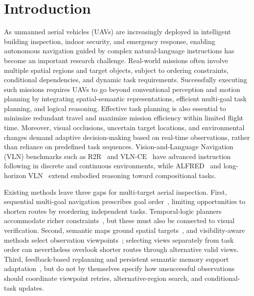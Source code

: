 \documentclass[letterpaper,10pt,journal]{IEEEtran}
\begin{document}
\section{Introduction}
As unmanned aerial vehicles (UAVs) are increasingly deployed in intelligent building inspection, indoor security, and emergency response, enabling autonomous navigation guided by complex natural-language instructions has become an important research challenge. Real-world missions often involve multiple spatial regions and target objects, subject to ordering constraints, conditional dependencies, and dynamic task requirements. Successfully executing such missions requires UAVs to go beyond conventional perception and motion planning by integrating spatial-semantic representations, efficient multi-goal task planning, and logical reasoning. Effective task planning is also essential to minimize redundant travel and maximize mission efficiency within limited flight time. Moreover, visual occlusions, uncertain target locations, and environmental changes demand adaptive decision-making based on real-time observations, rather than reliance on predefined task sequences. Vision-and-Language Navigation (VLN) benchmarks such as R2R~\cite{anderson2018r2r} and VLN-CE~\cite{krantz2020vlnce} have advanced instruction following in discrete and continuous environments, while ALFRED~\cite{shridhar2020alfred} and long-horizon VLN~\cite{song2024lhvln} extend embodied reasoning toward compositional tasks.

Existing methods leave three gaps for multi-target aerial inspection. First, sequential multi-goal navigation prescribes goal order~\cite{wani2020multion,khanna2024goat}, limiting opportunities to shorten routes by reordering independent tasks. Temporal-logic planners accommodate richer constraints~\cite{dai2024osgp}, but these must also be connected to visual verification. Second, semantic maps ground spatial targets~\cite{huang2023vlmaps,werby2024hovsg}, and visibility-aware methods select observation viewpoints~\cite{huang2026msgnav}; selecting views separately from task order can nevertheless overlook shorter routes through alternative valid views. Third, feedback-based replanning and persistent semantic memory support adaptation~\cite{rana2023sayplan,huang2023innermonologue,busch2025onemap}, but do not by themselves specify how unsuccessful observations should coordinate viewpoint retries, alternative-region search, and conditional-task updates.
\end{document}
